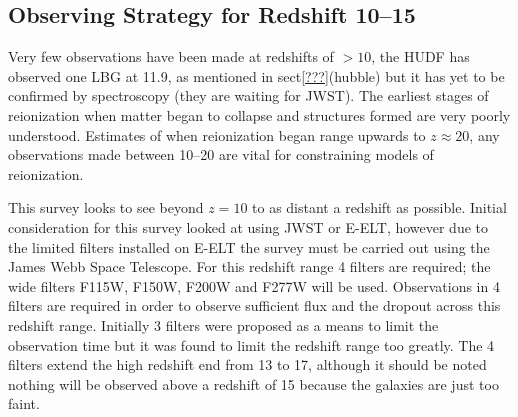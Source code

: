 
\subsection{Observing Strategy for Redshift 10--15} %
\label{sec:observing_strategy_for_redshifts_greater_than_10}
	Very few observations have been made at redshifts of $>10$, the HUDF has observed one LBG at 11.9, as mentioned in sect\ref{???}(hubble) but it has yet to be confirmed by spectroscopy (they are waiting for JWST). The earliest stages of reionization when matter began to collapse and structures formed are very poorly understood. Estimates of when reionization began range upwards to $z\approx20$, any observations made between 10--20 are vital for constraining models of reionization.

	This survey looks to see beyond $z=10$ to as distant a redshift as possible. Initial consideration for this survey looked at using JWST or E-ELT, however due to the limited filters installed on E-ELT the survey must be carried out using the James Webb Space Telescope. For this redshift range 4 filters are required; the wide filters F115W, F150W, F200W and F277W will be used. Observations in 4 filters are required in order to observe sufficient flux and the dropout across this redshift range. Initially 3 filters were proposed as a means to limit the observation time but it was found to limit the redshift range too greatly. The 4 filters extend the high redshift end from 13 to 17, although it should be noted nothing will be observed above a redshift of 15 because the galaxies are just too faint.

